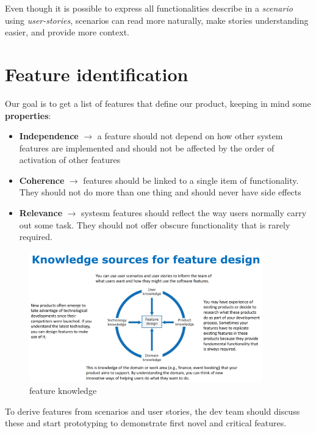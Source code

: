 Even though it is possible to express all functionalities describe in a \textit{scenario} using \textit{user-stories},
scenarios can read more naturally, make stories understanding easier, and provide more context.

\section{Feature identification}
Our goal is to get a list of features that define our product, keeping in mind some \textbf{properties}:
\begin{itemize}
    \item \textbf{Independence} $\rightarrow$ a feature should not depend on how other system features are implemented and should not be affected by the order of activation of other features
    \item \textbf{Coherence} $\rightarrow$ features should be linked to a single item of functionality.
    They should not do more than one thing and should never have side effects
    \item \textbf{Relevance} $\rightarrow$ systesm features should reflect the way users normally carry out some task.
    They should not offer obscure functionality that is rarely required.
\end{itemize}

\begin{figure}
    \centering
    \includegraphics[width=0.9\textwidth]{images/feature_design.png}
    \caption{feature knowledge}
    \label{fig:feature_knowledge}
\end{figure}

To derive features from scenarios and user stories, the dev team should discuss these and start prototyping to demonstrate first novel and critical features.

